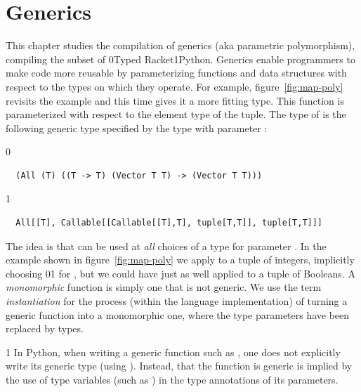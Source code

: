 \documentclass[7x10]{TimesAPriori_MIT}%
\def\racketEd{0}
\def\pythonEd{1}
\def\edition{1}
\newcommand{\racket}[1]{{\if\edition\racketEd{#1}\fi}}
\newcommand{\pythonColor}[0]{}
\newcommand{\python}[1]{{\if\edition\pythonEd\pythonColor #1\fi}}
\numberwithin{theorem}{chapter}
\numberwithin{definition}{chapter}
\numberwithin{equation}{chapter}
\begin{document}

\chapter{Generics}
\label{ch:Lpoly}
\setcounter{footnote}{0}

This chapter studies the compilation of
generics (aka parametric
polymorphism), compiling the
\LangPoly{} subset of \racket{Typed Racket}\python{Python}.  Generics
enable programmers to make code more reusable by parameterizing
functions and data structures with respect to the types on which they
operate. For example, figure~\ref{fig:map-poly} revisits the
 example and this time gives it a more fitting type.  This
 function is parameterized with respect to the element type
of the tuple. The type of  is the following generic type
specified by the  type with parameter :
{\if\edition\racketEd
\begin{lstlisting}
  (All (T) ((T -> T) (Vector T T) -> (Vector T T)))
\end{lstlisting}
\fi}
{\if\edition\pythonEd\pythonColor
\begin{lstlisting}
  All[[T], Callable[[Callable[[T],T], tuple[T,T]], tuple[T,T]]]
\end{lstlisting}
\fi}
%
The idea is that  can be used at \emph{all} choices of a
type for parameter . In the example shown in
figure~\ref{fig:map-poly} we apply  to a tuple of integers,
implicitly choosing \racket{}\python{} for
, but we could have just as well applied  to a tuple
of Booleans.
%
A \emph{monomorphic} function is simply one that is not generic.
%
We use the term \emph{instantiation} for the process (within the
language implementation) of turning a generic function into a
monomorphic one, where the type parameters have been replaced by
types.

{\if\edition\pythonEd\pythonColor
%
In Python, when writing a generic function such as , one
does not explicitly write its generic type (using ).
Instead, that the function is generic is implied by the use of type
variables (such as ) in the type annotations of its
parameters.
%
\fi}
\end{document}
